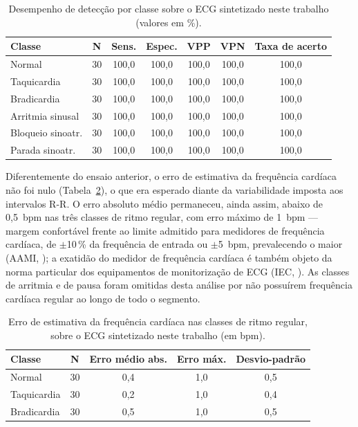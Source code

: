 \begin{table}[htb]
\centering
\caption{Desempenho de detecção por classe sobre o \acs{ECG} sintetizado neste trabalho (valores em \%).}
\label{tab:metricasClasse}
\begin{tabular}{l c c c c c c}
\hline
\textbf{Classe} & \textbf{N} & \textbf{Sens.} & \textbf{Espec.} & \textbf{\acs{VPP}} & \textbf{\acs{VPN}} & \textbf{Taxa de acerto} \\
\hline
Normal            & 30 & 100,0 & 100,0 & 100,0 & 100,0 & 100,0 \\
Taquicardia       & 30 & 100,0 & 100,0 & 100,0 & 100,0 & 100,0 \\
Bradicardia       & 30 & 100,0 & 100,0 & 100,0 & 100,0 & 100,0 \\
Arritmia sinusal  & 30 & 100,0 & 100,0 & 100,0 & 100,0 & 100,0 \\
Bloqueio sinoatr. & 30 & 100,0 & 100,0 & 100,0 & 100,0 & 100,0 \\
Parada sinoatr.   & 30 & 100,0 & 100,0 & 100,0 & 100,0 & 100,0 \\
\hline
\end{tabular}
\end{table}

Diferentemente do ensaio anterior, o erro de estimativa da frequência cardíaca não foi nulo
(Tabela~\ref{tab:erroFC}), o que era esperado diante da variabilidade imposta aos intervalos
R-R. O erro absoluto médio permaneceu, ainda assim, abaixo de 0,5~bpm nas três classes de
ritmo regular, com erro máximo de 1~bpm --- margem confortável frente ao limite admitido
para medidores de frequência cardíaca, de $\pm$10\,\% da frequência de entrada ou
$\pm$5~bpm, prevalecendo o maior (AAMI, \citeyear{aamiEC13}); a exatidão do medidor de
frequência cardíaca é também objeto da norma particular dos equipamentos de monitorização
de \acs{ECG} (IEC, \citeyear{iec6060127}). As classes de arritmia e de pausa foram omitidas
desta análise por não possuírem frequência cardíaca regular ao longo de todo o segmento.

\begin{table}[htb]
\centering
\caption{Erro de estimativa da frequência cardíaca nas classes de ritmo regular, sobre o \acs{ECG} sintetizado neste trabalho (em bpm).}
\label{tab:erroFC}
\begin{tabular}{l c c c c}
\hline
\textbf{Classe} & \textbf{N} & \textbf{Erro médio abs.} & \textbf{Erro máx.} & \textbf{Desvio-padrão} \\
\hline
Normal      & 30 & 0,4 & 1,0 & 0,5 \\
Taquicardia & 30 & 0,2 & 1,0 & 0,4 \\
Bradicardia & 30 & 0,5 & 1,0 & 0,5 \\
\hline
\end{tabular}
\end{table}

